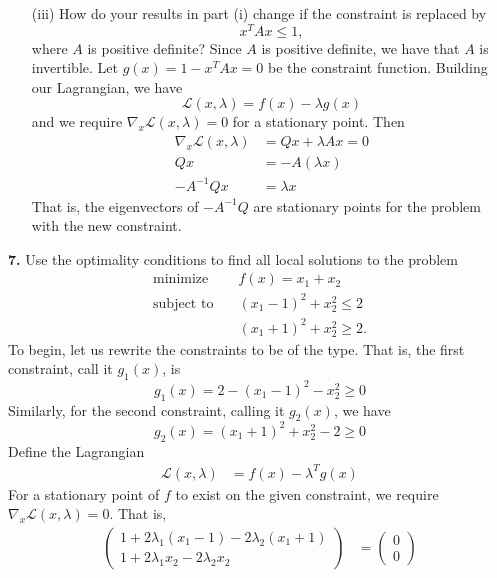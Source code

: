 \documentclass{article}
\begin{document}
\begin{itemize}
    \item[(iii)] How do your results in part (i) change if the constraint is replaced by 
    \[x^TAx \leq 1,\]
    where $A$ is positive definite?
    \newline\newline
    Since $A$ is positive definite, we have that $A$ is invertible. Let $g(x) = 1 - x^TAx = 0$ be the constraint function. Building our Lagrangian, we have
    \[\mathscr{L}(x,\lambda) = f(x) - \lambda g(x)\]
    and we require $\nabla_x\mathcal{L}(x,\lambda) = 0$ for a stationary point. Then
    \begin{align*}
        \nabla_x\mathscr{L}(x,\lambda) &= Qx + \lambda Ax = 0\\
        Qx &= -A(\lambda x)\\
        -A^{-1}Qx &= \lambda x
    \end{align*}
    That is, the eigenvectors of $-A^{-1}Q$ are stationary points for the problem with the new constraint.
    \newline\newline
\end{itemize}
\textbf{7.} Use the optimality conditions to find all local solutions to the problem
\begin{align*}
    \text{minimize} \hspace{1em} &f(x) = x_1 + x_2\\
    \text{subject to} \hspace{1em} &(x_1 - 1)^2 + x_2^2 \leq 2\\
    &(x_1 + 1)^2 + x_2^2 \geq 2.
\end{align*}
To begin, let us rewrite the constraints to be of the  type. That is, the first constraint, call it $g_1(x)$, is 
\[g_1(x) = 2 - (x_1 - 1)^2 - x_2^2 \geq 0\]
Similarly, for the second constraint, calling it $g_2(x)$, we have
\[g_2(x) = (x_1 + 1)^2 + x_2^2 -2 \geq 0\]
Define the Lagrangian 
\begin{align*}
    \mathscr{L}(x,\lambda) &= f(x) - \lambda^Tg(x)
\end{align*}
For a stationary point of $f$ to exist on the given constraint, we require $\nabla_x\mathscr{L}(x,\lambda) = 0$. That is,
\begin{align*}
    \begin{pmatrix}
        1 + 2\lambda_1(x_1 - 1) - 2\lambda_2(x_1 + 1)\\
        1 + 2\lambda_1x_2 - 2\lambda_2x_2
    \end{pmatrix}
    &= \begin{pmatrix}
        0\\
        0
    \end{pmatrix}
\end{align*}
\end{document}
